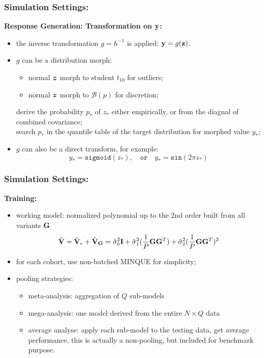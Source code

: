 \documentclass{beamer}
\begin{document}
\begin{frame}
  \frametitle{Simulation Settings:} %
  \textbf{Response Generation: Transformation on $\mathbf{y}$:}
  \begin{itemize}
  \item the inverse transformation $g=h^{-1}$ is applied:
    $\mathbf{y}=g(\mathbf{z})$.
  \item $g$ can be a distribution morph:
    \begin{itemize}
    \item normal $\boldsymbol{z}$ morph to student $t_{10}$ for outliers;
    \item normal $\boldsymbol{z}$ morph to $\mathcal{B}(p)$ for discretion;
    \end{itemize}
    derive the probability $p_*$ of $z_*$ either empirically, or from
    the diagnal of combined covariance; \\
    search $p_*$ in the quantile table of the target distribution for
    morphed value $y_*$;
  \item $g$ can also be a direct transform, for example:
    $$ y_* = \mathtt{sigmoid}(z_*), \quad \mathtt{or} \quad y_* = \mathtt{sin}(2\pi z_*) $$
  \end{itemize}
\end{frame}
\begin{frame}
  \frametitle{Simulation Settings:} %
  \textbf{Training:}
  \begin{itemize}
  \item working model: normalized polynomial up to the 2nd order built
    from all variants $\mathbf{G}$
    \begin{align}\label{eq:dvp}
      \hat{\mathbf{V}} = \hat{\mathbf{V}}_e + \hat{\mathbf{V}}_\mathbf{G} = \hat{\sigma}^2_0\textbf{I} +
      \hat{\sigma}_1^2 (\frac{1}{P}{\mathbf{G} \mathbf{G}^T}) + \hat{\sigma}_2^2
      (\frac{1}{P}{\mathbf{G} \mathbf{G}^T})^2
    \end{align}
  \item for each cohort, use non-batched MINQUE for simplicity;
  \item pooling strategies:
    \begin{itemize}
    \item meta-analysis: aggregation of $Q$ sub-models
    \item mega-analysis: one model derived from the entire
      $N \times Q$ data
    \item average analyse: apply each sub-model to the testing data,
      get average performance, this is actually a non-pooling, but
      included for benchmark purpose.
    \end{itemize}
  \end{itemize}
\end{frame}
\end{document}
